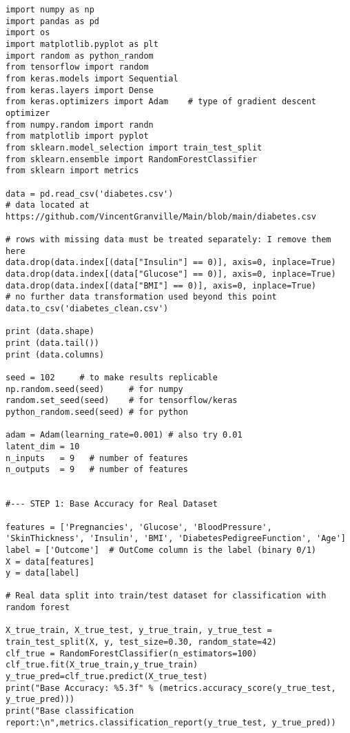 \documentclass[oneside,10pt]{book}
\begin{document}
\begin{lstlisting}
import numpy as np
import pandas as pd
import os
import matplotlib.pyplot as plt
import random as python_random
from tensorflow import random
from keras.models import Sequential
from keras.layers import Dense
from keras.optimizers import Adam    # type of gradient descent optimizer
from numpy.random import randn
from matplotlib import pyplot
from sklearn.model_selection import train_test_split
from sklearn.ensemble import RandomForestClassifier
from sklearn import metrics

data = pd.read_csv('diabetes.csv')
# data located at https://github.com/VincentGranville/Main/blob/main/diabetes.csv

# rows with missing data must be treated separately: I remove them here
data.drop(data.index[(data["Insulin"] == 0)], axis=0, inplace=True)
data.drop(data.index[(data["Glucose"] == 0)], axis=0, inplace=True)
data.drop(data.index[(data["BMI"] == 0)], axis=0, inplace=True)
# no further data transformation used beyond this point
data.to_csv('diabetes_clean.csv')

print (data.shape)
print (data.tail())
print (data.columns)

seed = 102     # to make results replicable
np.random.seed(seed)     # for numpy
random.set_seed(seed)    # for tensorflow/keras
python_random.seed(seed) # for python

adam = Adam(learning_rate=0.001) # also try 0.01
latent_dim = 10
n_inputs   = 9   # number of features
n_outputs  = 9   # number of features


#--- STEP 1: Base Accuracy for Real Dataset

features = ['Pregnancies', 'Glucose', 'BloodPressure', 'SkinThickness', 'Insulin', 'BMI', 'DiabetesPedigreeFunction', 'Age']
label = ['Outcome']  # OutCome column is the label (binary 0/1)
X = data[features]
y = data[label]

# Real data split into train/test dataset for classification with random forest

X_true_train, X_true_test, y_true_train, y_true_test = train_test_split(X, y, test_size=0.30, random_state=42)
clf_true = RandomForestClassifier(n_estimators=100)
clf_true.fit(X_true_train,y_true_train)
y_true_pred=clf_true.predict(X_true_test)
print("Base Accuracy: %5.3f" % (metrics.accuracy_score(y_true_test, y_true_pred)))
print("Base classification report:\n",metrics.classification_report(y_true_test, y_true_pred))
\end{lstlisting}
\end{document}
